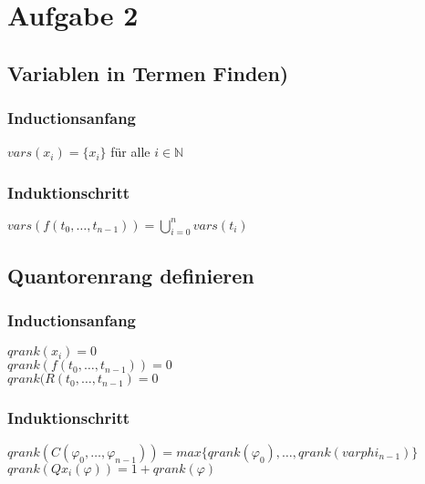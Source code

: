 \section*{Aufgabe 2}

\subsection*{Variablen in Termen Finden)}

\subsubsection*{Inductionsanfang}
$vars(x_i)=\{ x_i\} $ für alle $i \in \mathbb{N}$


\subsubsection*{Induktionschritt}
$vars(f(t_0, \ldots , t_{n-1}))= \bigcup_{i=0}^{n} vars(t_i)$

\subsection*{Quantorenrang definieren}
\subsubsection*{Inductionsanfang}
$qrank(x_i)=0$\\
$qrank(f(t_0, \ldots ,t_{n-1} ))=0$\\
$qrank(R(t_0, \ldots , t_{n-1})=0$\\
\subsubsection*{Induktionschritt}
$qrank(C(\varphi_{0}, \ldots , \varphi_{n-1}))= max\{ qrank(\varphi_{0}) , \ldots , qrank(varphi_{n-1}) \}$\\
$qrank(Qx_i (\varphi))= 1+ qrank(\varphi)$

